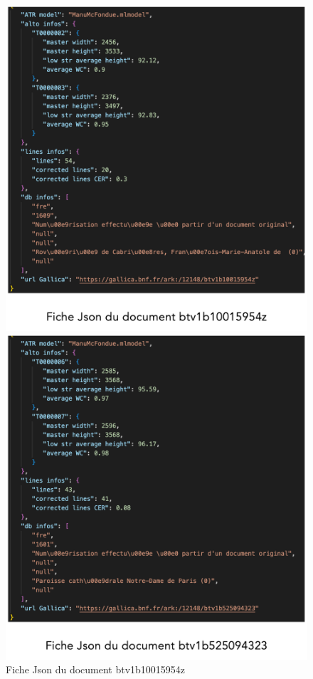 \documentclass[a4paper,12pt,twoside]{book}
\begin{document}
	\begin{figure}[h!]
		\centering
		\begin{minipage}{0.45\textwidth}
			\centering
			\includegraphics[width=\textwidth]{images/fiche_json_a.png}
			\caption{Fiche Json du document btv1b10015954z }
			\label{fig:image1}
		\end{minipage}\hfill
		\begin{minipage}{0.45\textwidth}
			\centering
			\includegraphics[width=\textwidth]{images/fiche_json_a1.png}

\end{minipage}
\end{figure}
\end{document}
